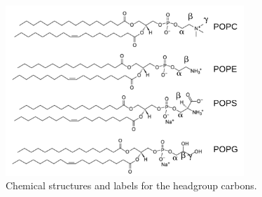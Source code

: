 \documentclass[aps,prl,superscriptaddress,twocolumn]{revtex4}
\begin{document}
\begin{figure}[]
  \centering
  \includegraphics[width=9.0cm]{../Figs/lipids.pdf}
  \caption{\label{lipids}
    Chemical structures and labels for the headgroup carbons.
  }
\end{figure}






\end{document}
